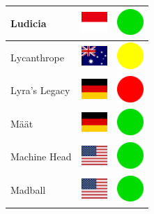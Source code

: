 \documentclass[12pt, a4paper, twoside]{report}
\begin{document}
\begin{center}
\begin{longtable}{|p{5cm}|p{2cm}|p{2cm}|}
Ludicia & \includegraphics[width=1cm]{4x3/id} & \includegraphics[width=1cm]{likes/y} \\ \hline
Lycanthrope & \includegraphics[width=1cm]{4x3/au} & \includegraphics[width=1cm]{likes/m} \\ \hline
Lyra's Legacy & \includegraphics[width=1cm]{4x3/de} & \includegraphics[width=1cm]{likes/n} \\ \hline
Määt & \includegraphics[width=1cm]{4x3/de} & \includegraphics[width=1cm]{likes/y} \\ \hline
Machine Head & \includegraphics[width=1cm]{4x3/us} & \includegraphics[width=1cm]{likes/y} \\ \hline
Madball & \includegraphics[width=1cm]{4x3/us} & \includegraphics[width=1cm]{likes/y} \\ \hline

\end{longtable}
\end{center}
\end{document}
